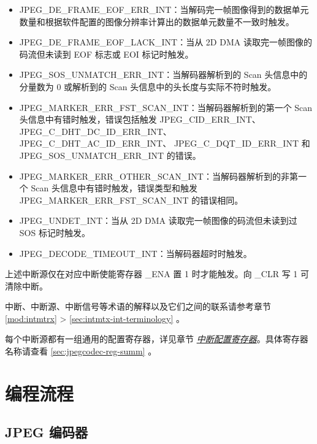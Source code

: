 \documentclass[main\_\_CN.tex]{subfiles}
\begin{document}
\begin{itemize}
\item JPEG\_DE\_FRAME\_EOF\_ERR\_INT：当解码完一帧图像得到的数据单元数量和根据软件配置的图像分辨率计算出的数据单元数量不一致时触发。
\item JPEG\_DE\_FRAME\_EOF\_LACK\_INT：当从 2D DMA 读取完一帧图像的码流但未读到 EOF 标志或 EOI 标记时触发。
\item JPEG\_SOS\_UNMATCH\_ERR\_INT：当解码器解析到的 Scan 头信息中的分量数为 0 或解析到的 Scan 头信息中的头长度与实际不符时触发。
\item JPEG\_MARKER\_ERR\_FST\_SCAN\_INT：当解码器解析到的第一个 Scan 头信息中有错时触发，错误包括触发 JPEG\_CID\_ERR\_INT、 JPEG\_C\_DHT\_DC\_ID\_ERR\_INT、 JPEG\_C\_DHT\_AC\_ID\_ERR\_INT、 JPEG\_C\_DQT\_ID\_ERR\_INT 和 JPEG\_SOS\_UNMATCH\_ERR\_INT 的错误。
\item JPEG\_MARKER\_ERR\_OTHER\_SCAN\_INT：当解码器解析到的非第一个 Scan 头信息中有错时触发，错误类型和触发 JPEG\_MARKER\_ERR\_FST\_SCAN\_INT 的错误相同。
\item JPEG\_UNDET\_INT：当从 2D DMA 读取完一帧图像的码流但未读到过 SOS 标记时触发。
\item JPEG\_DECODE\_TIMEOUT\_INT：当解码器超时时触发。
\end{itemize}

上述中断源仅在对应中断使能寄存器 \_ENA 置 1 时才能触发。向 \_CLR 写 1 可清除中断。

\begin{tiplisting}
中断、中断源、中断信号等术语的解释以及它们之间的联系请参考章节 \ref{mod:intmtrx} \textit{} > \ref{sec:intmtx-int-terminology} \textit{}。
\end{tiplisting}

每个中断源都有一组通用的配置寄存器，详见章节 \hyperref[interrupt-config-registers]{\textit{中断配置寄存器}}。具体寄存器名称请查看 \ref{sec:jpegcodec-reg-summ} \textit{}。



\section{编程流程}
\label{sec:jpegcodec-prog-procedures}

\subsection{JPEG 编码器}
\label{sec:jpegcodec-enc-prog}
\end{document}
